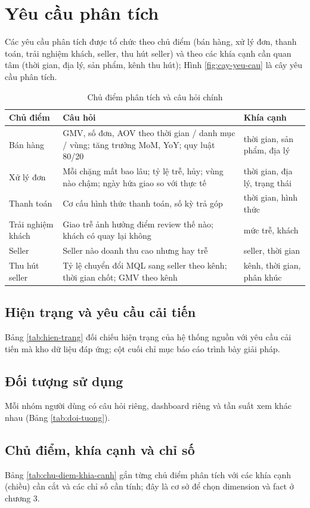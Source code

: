\section{Yêu cầu phân tích}\label{sec:yeu-cau}
Các yêu cầu phân tích được tổ chức theo chủ điểm (bán hàng, xử lý đơn, thanh toán, trải nghiệm khách, seller, thu hút seller) và theo các khía cạnh cần quan tâm (thời gian, địa lý, sản phẩm, kênh thu hút); Hình \ref{fig:cay-yeu-cau} là cây yêu cầu phân tích.
\begin{table}[htbp]\centering\small\caption{Chủ điểm phân tích và câu hỏi chính}\label{tab:chu-diem}
\begin{tabular}{p{2.8cm}p{8cm}p{3.6cm}}\toprule
\textbf{Chủ điểm} & \textbf{Câu hỏi} & \textbf{Khía cạnh}\\\midrule
Bán hàng & GMV, số đơn, AOV theo thời gian / danh mục / vùng; tăng trưởng MoM, YoY; quy luật 80/20 & thời gian, sản phẩm, địa lý\\
Xử lý đơn & Mỗi chặng mất bao lâu; tỷ lệ trễ, hủy; vùng nào chậm; ngày hứa giao so với thực tế & thời gian, địa lý, trạng thái\\
Thanh toán & Cơ cấu hình thức thanh toán, số kỳ trả góp & thời gian, hình thức\\
Trải nghiệm khách & Giao trễ ảnh hưởng điểm review thế nào; khách có quay lại không & mức trễ, khách\\
Seller & Seller nào doanh thu cao nhưng hay trễ & seller, thời gian\\
Thu hút seller & Tỷ lệ chuyển đổi MQL sang seller theo kênh; thời gian chốt; GMV theo kênh & kênh, thời gian, phân khúc\\\bottomrule
\end{tabular}\end{table}

\subsection{Hiện trạng và yêu cầu cải tiến}\label{sec:hien-trang}
Bảng \ref{tab:hien-trang} đối chiếu hiện trạng của hệ thống nguồn với yêu cầu cải tiến mà kho dữ liệu đáp ứng; cột cuối chỉ mục báo cáo trình bày giải pháp.


\subsection{Đối tượng sử dụng}\label{sec:doi-tuong}
Mỗi nhóm người dùng có câu hỏi riêng, dashboard riêng và tần suất xem khác nhau (Bảng \ref{tab:doi-tuong}).


\subsection{Chủ điểm, khía cạnh và chỉ số}\label{sec:chu-diem-khia-canh}
Bảng \ref{tab:chu-diem-khia-canh} gắn từng chủ điểm phân tích với các khía cạnh (chiều) cần cắt và các chỉ số cần tính; đây là cơ sở để chọn dimension và fact ở chương 3.

